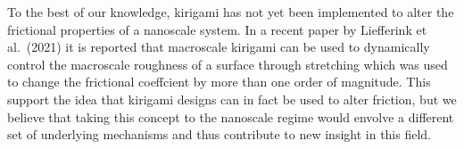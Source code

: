 To the best of our knowledge, kirigami has not yet been implemented to alter the
frictional properties of a nanoscale system. In a recent paper by Liefferink et
al.\ \cite{LIEFFERINK2021101475}(2021) it is reported that macroscale kirigami
can be used to dynamically control the macroscale roughness of a surface through
stretching which was used to change the frictional coeffcient by more than one
order of magnitude. This support the idea that kirigami designs can in fact be
used to alter friction, but we believe that taking this concept to the nanoscale
regime would envolve a different set of underlying mechanisms and thus
contribute to new insight in this field.
















